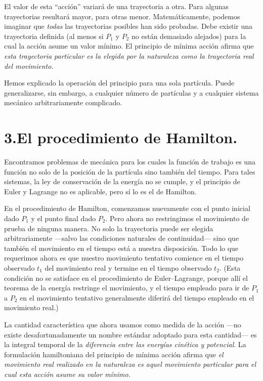 El valor de esta ``acción'' variará de una trayectoria a otra. Para algunas trayectorias resultará mayor, para otras menor. Matemáticamente, podemos imaginar que \textit{todas} las trayectorias posibles han sido probadas. Debe existir una trayectoria definida (al menos si $P_1$ y $P_2$ no están demasiado alejados) para la cual la acción asume un valor mínimo. El principio de mínima acción afirma que \textit{esta trayectoria particular es la elegida por la naturaleza como la trayectoria real del movimiento}.

Hemos explicado la operación del principio para una sola partícula. Puede generalizarse, sin embargo, a cualquier número de partículas y a cualquier sistema mecánico arbitrariamente complicado.

\section*{3.\quad El procedimiento de Hamilton.}

Encontramos problemas de mecánica para los cuales la función de trabajo es una función no solo de la posición de la partícula sino también del tiempo. Para tales sistemas, la ley de conservación de la energía no se cumple, y el principio de Euler y Lagrange no es aplicable, pero sí lo es el de Hamilton.

En el procedimiento de Hamilton, comenzamos nuevamente con el punto inicial dado $P_1$ y el punto final dado $P_2$. Pero ahora no restringimos el movimiento de prueba de ninguna manera. No solo la trayectoria puede ser elegida arbitrariamente ---salvo las condiciones naturales de continuidad--- sino que también el movimiento en el tiempo está a nuestra disposición. Todo lo que requerimos ahora es que nuestro movimiento tentativo comience en el tiempo observado $t_1$ del movimiento real y termine en el tiempo observado $t_2$. (Esta condición no se satisface en el procedimiento de Euler--Lagrange, porque allí el teorema de la energía restringe el movimiento, y el tiempo empleado para ir de $P_1$ a $P_2$ en el movimiento tentativo generalmente diferirá del tiempo empleado en el movimiento real.)

La cantidad característica que ahora usamos como medida de la acción ---no existe desafortunadamente un nombre estándar adoptado para esta cantidad--- es la integral temporal de la \textit{diferencia entre las energías cinética y potencial}. La formulación hamiltoniana del principio de mínima acción afirma que \textit{el movimiento real realizado en la naturaleza es aquel movimiento particular para el cual esta acción asume su valor mínimo}.

